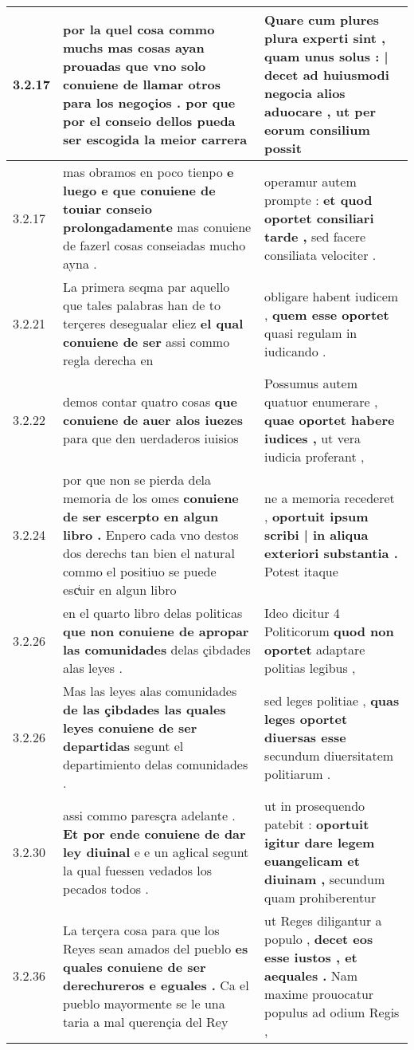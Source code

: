 \begin{tabular}{|p{1cm}|p{6.5cm}|p{6.5cm}|}
3.2.17 & por la quel cosa commo muchs mas cosas ayan prouadas \textbf{ que vno solo conuiene de llamar otros } para los negoçios . por que por el conseio dellos pueda ser escogida la meior carrera & Quare cum plures plura experti sint , \textbf{ quam unus solus : | decet ad huiusmodi negocia alios aduocare , } ut per eorum consilium possit \\\hline
3.2.17 & mas obramos en poco tienpo \textbf{ e luego e que conuiene de touiar conseio prolongadamente } mas conuiene de fazerl cosas conseiadas mucho ayna . & operamur autem prompte : \textbf{ et quod oportet consiliari tarde , } sed facere consiliata velociter . \\\hline
3.2.21 & La primera seqma par aquello que tales palabras han de to terçeres desegualar eliez \textbf{ el qual conuiene de ser } assi commo regla derecha en & obligare habent iudicem , \textbf{ quem esse oportet } quasi regulam in iudicando . \\\hline
3.2.22 & demos contar quatro cosas \textbf{ que conuiene de auer alos iuezes } para que den uerdaderos iuisios & Possumus autem quatuor enumerare , \textbf{ quae oportet habere iudices , } ut vera iudicia proferant , \\\hline
3.2.24 & por que non se pierda dela memoria de los omes \textbf{ conuiene de ser escerpto en algun libro . } Enpero cada vno destos dos derechs tan bien el natural commo el positiuo se puede escͥuir en algun libro & ne a memoria recederet , \textbf{ oportuit ipsum scribi | in aliqua exteriori substantia . } Potest itaque \\\hline
3.2.26 & en el quarto libro delas politicas \textbf{ que non conuiene de apropar las comunidades } delas çibdades alas leyes . & Ideo dicitur 4 Politicorum \textbf{ quod non oportet } adaptare politias legibus , \\\hline
3.2.26 & Mas las leyes alas comunidades \textbf{ de las çibdades las quales leyes conuiene de ser departidas } segunt el departimiento delas comunidades . & sed leges politiae , \textbf{ quas leges oportet diuersas esse } secundum diuersitatem politiarum . \\\hline
3.2.30 & assi commo paresçra adelante . \textbf{ Et por ende conuiene de dar ley diuinal } e e un agłical segunt la qual fuessen vedados los pecados todos . & ut in prosequendo patebit : \textbf{ oportuit igitur dare legem euangelicam et diuinam , } secundum quam prohiberentur \\\hline
3.2.36 & La terçera cosa para que los Reyes sean amados del pueblo \textbf{ es quales conuiene de ser derechureros e eguales . } Ca el pueblo mayormente se le una taria a mal querençia del Rey & ut Reges diligantur a populo , \textbf{ decet eos esse iustos , et aequales . } Nam maxime prouocatur populus ad odium Regis , \\\hline

\end{tabular}
